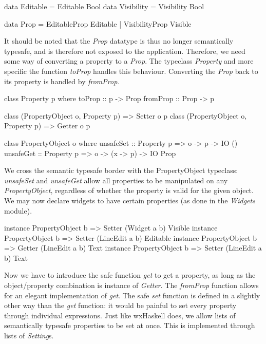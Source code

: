 \documentclass[11pt,a4paper]{article}
\begin{document}
\begin{haskell}
data Editable = Editable Bool
data Visibility = Visibility Bool

data Prop = EditableProp Editable
          | VisibilityProp Visible
\end{haskell}

It should be noted that the \textit{Prop} datatype is thus no longer semantically typesafe, and is therefore not exposed to the application.
Therefore, we need some way of converting a property to a \textit{Prop}.
The typeclass \textit{Property} and more specific the function \textit{toProp} handles this behaviour.
Converting the \textit{Prop} back to its property is handled by \textit{fromProp}.

\begin{haskell}
class Property p where
    toProp :: p -> Prop
    fromProp :: Prop -> p

class (PropertyObject o, Property p) => Setter o p
class (PropertyObject o, Property p) => Getter o p

class PropertyObject o where
    unsafeSet :: Property p => o -> p -> IO ()
    unsafeGet :: Property p => o -> (x -> p) -> IO Prop
\end{haskell}

We cross the semantic typesafe border with the PropertyObject typeclass: \textit{unsafeSet} and \textit{unsafeGet} allow all properties to be manipulated on any \textit{PropertyObject}, regardless of whether the property is valid for the given object.
We may now declare widgets to have certain properties (as done in the \textit{Widgets} module).

\begin{haskell}
instance PropertyObject b => Setter (Widget a b) Visible
instance PropertyObject b => Setter (LineEdit a b) Editable
instance PropertyObject b => Getter (LineEdit a b) Text
instance PropertyObject b => Setter (LineEdit a b) Text
\end{haskell}

Now we have to introduce the safe function \textit{get} to get a property, as long as the object/property combination is instance of \textit{Getter}.
The \textit{fromProp} function allows for an elegant implementation of \textit{get}.
The safe \textit{set} function is defined in a slightly other way than the \textit{get} function: it would be painful to set every property through individual expressions.
Just like wxHaskell does, we allow lists of semantically typesafe properties to be set at once.
This is implemented through lists of \textit{Setting}s.
\end{document}
